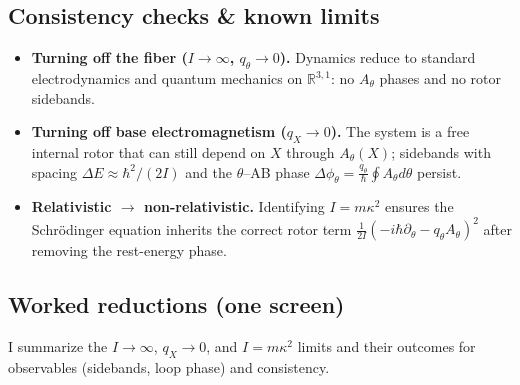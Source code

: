 \subsection{Consistency checks \& known limits}\label{sec:consistency-checks}
\begin{itemize}
  \item \textbf{Turning off the fiber ($I\to\infty$, $q_\theta\to 0$).} Dynamics reduce to standard electrodynamics and quantum mechanics on $\mathbb R^{3,1}$: no $A_\theta$ phases and no rotor sidebands.
  \item \textbf{Turning off base electromagnetism ($q_X\to 0$).} The system is a free internal rotor that can still depend on $X$ through $A_\theta(X)$; sidebands with spacing $\Delta E\approx \hbar^2/(2I)$ and the $\theta$--AB phase $\Delta\phi_\theta=\tfrac{q_\theta}{\hbar}\oint A_\theta d\theta$ persist.
  \item \textbf{Relativistic $\to$ non-relativistic.} Identifying $I=m\kappa^2$ ensures the Schr\"odinger equation inherits the correct rotor term $\tfrac{1}{2I}(-i\hbar\partial_\theta-q_\theta A_\theta)^2$ after removing the rest-energy phase.
\end{itemize}

\subsection{Worked reductions (one screen)}\label{sec:worked-reductions}
I summarize the $I\to\infty$, $q_X\to 0$, and $I=m\kappa^2$ limits and their outcomes for observables (sidebands, loop phase) and consistency.
